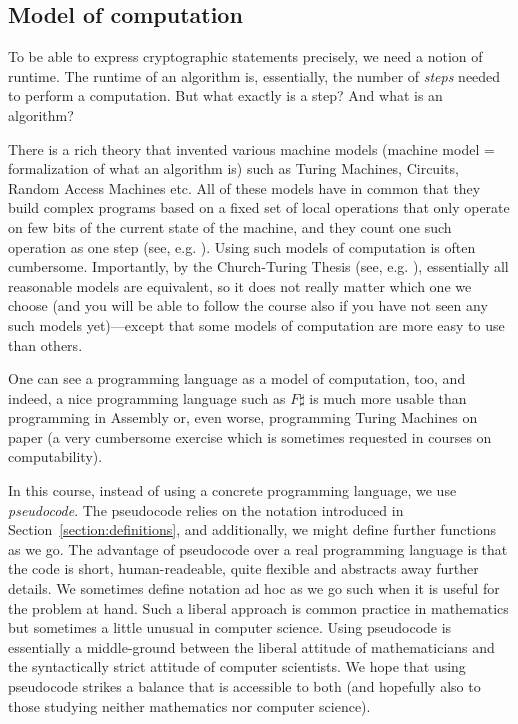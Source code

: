 \subsection{Model of computation}\label{ssec:model-of-computation}
To be able to express cryptographic statements precisely, we need a notion of runtime. The runtime of an algorithm is, essentially, the number of \emph{steps} needed to perform a computation. But what exactly is a step? And what is an algorithm?

There is a rich theory that invented various machine models (machine model = formalization of what an algorithm is) such as Turing Machines, Circuits, Random Access Machines etc. All of these models have in common that they build complex programs based on a fixed set of local operations that only operate on few bits of the current state of the machine, and they count one such operation as one step (see, e.g. \cite[Chapters 1.2.2 and 1.2.3]{goldreichcomplexity}). Using such models of computation is often cumbersome. Importantly, by the Church-Turing Thesis (see, e.g. \cite[Chapter 1.2.3]{goldreichcomplexity}), essentially all reasonable models are equivalent, so it does not really matter which one we choose (and you will be able to follow the course also if you have not seen any such models yet)---except that some models of computation are more easy to use than others.

One can see a programming language as a model of computation, too, and indeed, a nice programming language such as $F\sharp$ is much more usable than programming in Assembly or, even worse, programming Turing Machines on paper (a very cumbersome exercise which is sometimes requested in courses on computability).

In this course, instead of using a concrete programming language, we use \emph{pseudocode}. The pseudocode relies on the notation introduced in Section~\ref{section:definitions}, and additionally, we might define further functions as we go. The advantage of pseudocode over a real programming language is that the code is short, human-readeable, quite flexible and abstracts away further details. We sometimes define notation ad hoc as we go such when it is useful for the problem at hand. Such a liberal approach is common practice in mathematics but sometimes a little unusual in computer science. Using pseudocode is essentially a middle-ground between the liberal attitude of mathematicians and the syntactically strict attitude of computer scientists. We hope that using pseudocode strikes a balance that is accessible to both (and hopefully also to those studying neither mathematics nor computer science).

